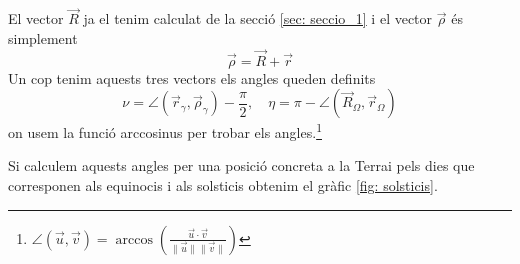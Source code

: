 \documentclass[11pt]{article}
\begin{document}
El vector $\vec{R}$ ja el tenim calculat de la secció \ref{sec: seccio_1} i el vector $\vec{\rho}$ és simplement
\begin{equation}
    \vec{\rho}= \vec{R}+\vec{r}
\end{equation}
Un cop tenim aquests tres vectors els angles queden definits
\begin{equation}
    \nu=\angle (\vec{r}_{\gamma}, \vec{\rho}_{\gamma}) -\frac{\pi}{2},  \quad
\eta=\pi - \angle (\vec{R}_{\Omega}, \vec{r}_{\Omega})
\end{equation}
on usem la funció arccosinus per trobar els angles.\footnote{$\angle (\vec{u}, \vec{v})= \arccos\left(\frac{\vec{u} \cdot \vec{v}}{\|\vec{u}\| \|\vec{v}\|}\right)$}


Si calculem aquests angles per una posició concreta a la Terrai pels dies que corresponen als equinocis i als solsticis obtenim el gràfic \ref{fig: solsticis}.
\end{document}
